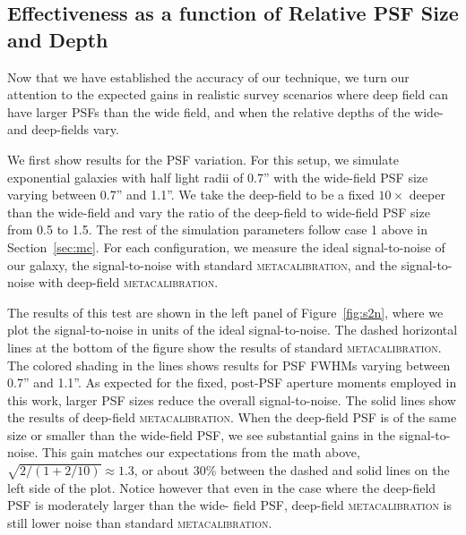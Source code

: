 \documentclass[twocolumn]{openjournal}
\makeatletter
\newcommand{\mcal}{\textsc{metacalibration}\@\xspace}
\makeatother
\begin{document}
\subsection{Effectiveness as a function of Relative PSF Size and Depth}\label{sec:sizedepth}

Now that we have established the accuracy of our technique, we turn our
attention to the expected gains in realistic survey scenarios where deep field
can have larger PSFs than the wide field, and when the relative depths of the
wide- and deep-fields vary.

We first show results for the PSF variation.  For this setup, we simulate
exponential galaxies with half light radii of 0.7'' with the wide-field PSF size varying
between 0.7'' and 1.1''. We take the deep-field to be a fixed $10\times$ deeper than the
wide-field and vary the ratio of the deep-field to wide-field PSF size from 0.5 to 1.5.
The rest of the simulation parameters follow case 1 above in Section~\ref{sec:mc}.
For each configuration, we measure the ideal signal-to-noise of
our galaxy, the signal-to-noise with standard \mcal, and the signal-to-noise with
deep-field \mcal.

The results of this test are shown in the left panel of Figure~\ref{fig:s2n}, where we
plot the signal-to-noise in units of the ideal signal-to-noise. The dashed horizontal
lines at the bottom of the figure show the results of standard \mcal. The colored
shading in the lines shows results for PSF FWHMs varying between 0.7'' and 1.1''. As
expected for the fixed, post-PSF aperture moments employed in this work, larger PSF
sizes reduce the overall signal-to-noise. The solid lines show the results of deep-field
\mcal. When the deep-field PSF is of the same size or smaller than the wide-field PSF,
we see substantial gains in the signal-to-noise. This gain matches our expectations from
the math above, $\sqrt{2/(1 + 2/10)}\approx1.3$, or about 30\% between the dashed and
solid lines on the left side of the plot. Notice however that even in the case where the
deep-field PSF is moderately larger than the wide- field PSF, deep-field \mcal is still
lower noise than standard \mcal.
\end{document}
